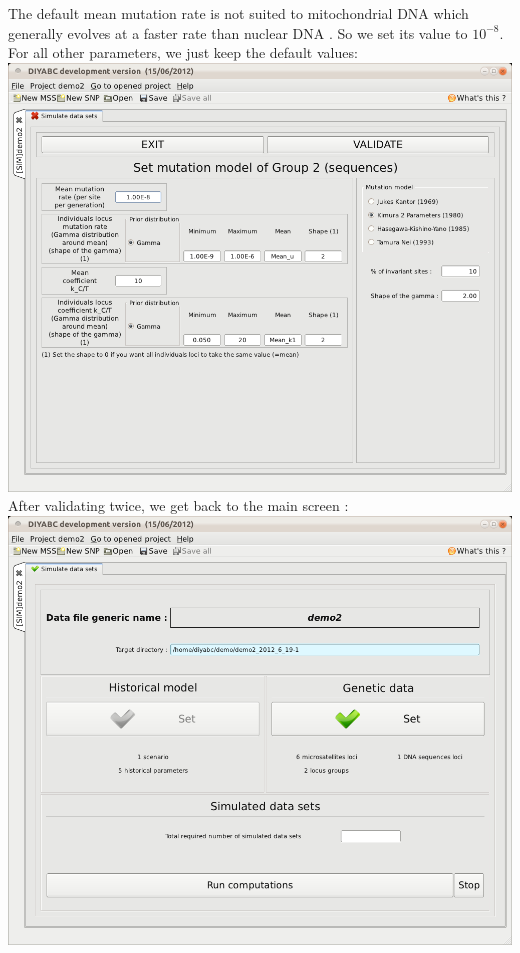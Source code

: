 The default mean mutation rate is not suited to mitochondrial DNA which generally evolves at a faster rate than nuclear DNA \citep{HL2008}. So we set its value to $10^{-8}$. For all other parameters, we just keep the default values:\\

\includegraphics[scale=0.33]{gui_pictures/Capture-DIYABC-83.png} \\

After validating twice, we get back to the main screen :\\ 

\includegraphics[scale=0.33]{gui_pictures/Capture-DIYABC-84.png} \\

